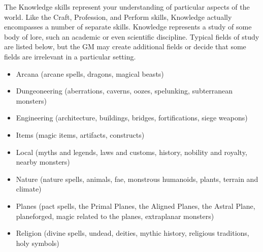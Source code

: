 \newpage
{}
  The Knowledge skills represent your understanding of particular aspects of the world.
  Like the Craft, Profession, and Perform skills, Knowledge actually encompasses a number of separate skills.
  Knowledge represents a study of some body of lore, such an academic or even scientific discipline.
  Typical fields of study are listed below, but the GM may create additional fields or decide that some fields are irrelevant in a particular setting.
  \begin{itemize}
    \item Arcana (arcane spells, dragons, magical beasts)
    \item Dungeoneering (aberrations, caverns, oozes, spelunking, subterranean monsters)
    \item Engineering (architecture, buildings, bridges, fortifications, siege weapons)
    \item Items (magic items, artifacts, constructs)
    \item Local (myths and legends, laws and customs, history, nobility and royalty, nearby monsters)
    \item Nature (nature spells, animals, fae, monstrous humanoids, plants, terrain and climate)
    \item Planes (pact spells, the Primal Planes, the Aligned Planes, the Astral Plane,
      planeforged, magic related to the planes, extraplanar monsters)
    \item Religion (divine spells, undead, deities, mythic history, religious traditions, holy symbols)
  \end{itemize}

